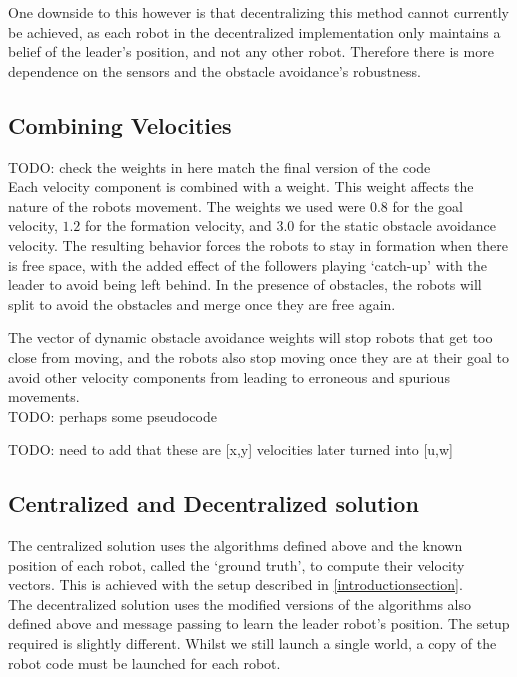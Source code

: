 \documentclass[letterpaper, 10 pt, conference]{ieeeconf}  %
\begin{document}
One downside to this however is that decentralizing this method cannot currently be achieved, as each robot in the decentralized implementation only maintains a belief of the leader's position, and not any other robot. Therefore there is more dependence on the sensors and the obstacle avoidance's robustness.

\subsection{Combining Velocities}
\label{combiningsubsection}

TODO: check the weights in here match the final version of the code \\

Each velocity component is combined with a weight. This weight affects the nature of the robots movement. The weights we used were $0.8$ for the goal velocity, $1.2$ for the formation velocity, and $3.0$ for the static obstacle avoidance velocity. The resulting behavior forces the robots to stay in formation when there is free space, with the added effect of the followers playing `catch-up' with the leader to avoid being left behind. In the presence of obstacles, the robots will split to avoid the obstacles and merge once they are free again.

The vector of dynamic obstacle avoidance weights will stop robots that get too close from moving, and the robots also stop moving once they are at their goal to avoid other velocity components from leading to erroneous and spurious movements. \\

TODO: perhaps some pseudocode

TODO: need to add that these are [x,y] velocities later turned into [u,w]

\subsection{Centralized and Decentralized solution}

The centralized solution uses the algorithms defined above and the known position of each robot, called the `ground truth', to compute their velocity vectors. This is achieved with the setup described in \ref{introductionsection}. \\

The decentralized solution uses the modified versions of the algorithms also defined above and message passing to learn the leader robot's position. The setup required is slightly different. Whilst we still launch a single world, a copy of the robot code must be launched for each robot. \\
\end{document}
